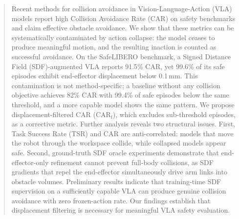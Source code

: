 \begin{abstract}
Recent methods for collision avoidance in Vision-Language-Action (VLA) models report high Collision Avoidance Rate (CAR) on safety benchmarks and claim effective obstacle avoidance. We show that these metrics can be systematically contaminated by action collapse: the model ceases to produce meaningful motion, and the resulting inaction is counted as successful avoidance. On the SafeLIBERO benchmark, a Signed Distance Field (SDF)-augmented VLA reports 91.5\% CAR, yet 99.6\% of its safe episodes exhibit end-effector displacement below 0.1\,mm. This contamination is not method-specific; a baseline without any collision objective achieves 82\% CAR with 99.4\% of safe episodes below the same threshold, and a more capable model shows the same pattern. We propose displacement-filtered CAR (CAR$_\text{f}$), which excludes sub-threshold episodes, as a corrective metric. Further analysis reveals two structural issues. First, Task Success Rate (TSR) and CAR are anti-correlated: models that move the robot through the workspace collide, while collapsed models appear safe. Second, ground-truth SDF oracle experiments demonstrate that end-effector-only refinement cannot prevent full-body collisions, as SDF gradients that repel the end-effector simultaneously drive arm links into obstacle volumes. Preliminary results indicate that training-time SDF supervision on a sufficiently capable VLA can produce genuine collision avoidance with zero frozen-action rate. Our findings establish that displacement filtering is necessary for meaningful VLA safety evaluation.
\end{abstract}
